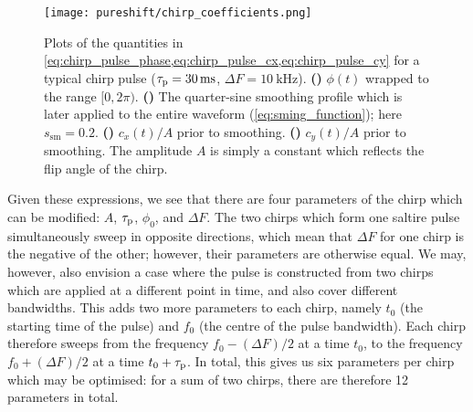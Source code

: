 \begin{figure}[htb]
    \centering
    \texttt{[image: pureshift/chirp\_coefficients.png]}
    {\label{fig:chirp_coefficients_phase}}
    {\label{fig:chirp_coefficients_smoothing}}
    {\label{fig:chirp_coefficients_cx}}
    {\label{fig:chirp_coefficients_cy}}
    \caption[Phase and Cartesian amplitudes of a typical chirp pulse]{
        Plots of the quantities in \cref{eq:chirp_pulse_phase,eq:chirp_pulse_cx,eq:chirp_pulse_cy} for a typical chirp pulse ($\taup = \SI{30}{\ms}$, $\Delta F = \SI{10}{\kHz}$).
        \textbf{()} $\phi(t)$ wrapped to the range $[0, 2\pi)$.
        \textbf{()} The quarter-sine smoothing profile which is later applied to the entire waveform (\cref{eq:sming_function}); here $s_\text{sm} = 0.2$.
        \textbf{()} $c_x(t)/A$ prior to smoothing.
        \textbf{()} $c_y(t)/A$ prior to smoothing.
        The amplitude $A$ is simply a constant which reflects the flip angle of the chirp.\autocite{Foroozandeh2018CEJ}
    }
    \label{fig:chirp_coefficients}
\end{figure}

Given these expressions, we see that there are four parameters of the chirp which can be modified: $A$, $\tau_\mathrm{p}$, $\phi_0$, and $\Delta F$.
The two chirps which form one saltire pulse simultaneously sweep in opposite directions, which mean that $\Delta F$ for one chirp is the negative of the other; however, their parameters are otherwise equal.
We may, however, also envision a case where the pulse is constructed from two chirps which are applied at a different point in time, and also cover different bandwidths.
This adds two more parameters to each chirp, namely $t_0$ (the starting time of the pulse) and $f_0$ (the centre of the pulse bandwidth).
Each chirp therefore sweeps from the frequency $f_0 - (\Delta F)/2$ at a time $t_0$, to the frequency $f_0 + (\Delta F)/2$ at a time $t_0 + \tau_\mathrm{p}$.
In total, this gives us six parameters per chirp which may be optimised: for a sum of two chirps, there are therefore 12 parameters in total.

